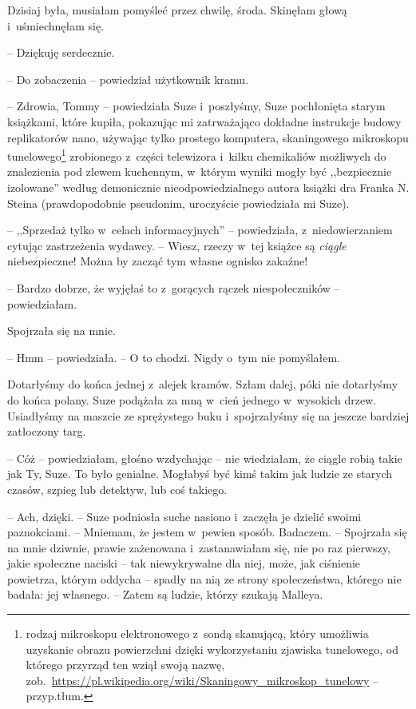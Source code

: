 \documentclass[oneside,polish,11pt,sfheadings]{mwbk}
\begin{document}
Dzisiaj była, musiałam pomyśleć przez chwilę, środa. Skinęłam głową i~uśmiechnęłam się. 

-- Dziękuję serdecznie.

-- Do zobaczenia -- powiedział użytkownik kramu.

-- Zdrowia, Tommy -- powiedziała Suze i~poszłyśmy, Suze pochłonięta starym
książkami, które kupiła, pokazując mi zatrważająco dokładne instrukcje
budowy replikatorów nano, używając tylko prostego komputera,
skaningowego mikroskopu tunelowego\footnote{ rodzaj mikroskopu elektronowego z~sondą skanującą, który umożliwia uzyskanie obrazu powierzchni dzięki
wykorzystaniu zjawiska tunelowego, od którego przyrząd ten wziął swoją
nazwę,
zob.~\url{https://pl.wikipedia.org/wiki/Skaningowy\_mikroskop\_tunelowy}
-- przyp.tłum.} zrobionego z~części telewizora i~kilku chemikaliów
możliwych do znalezienia pod zlewem kuchennym, w~którym wyniki mogły być
,,bezpiecznie izolowane'' według demonicznie nieodpowiedzialnego autora
książki dra Franka N. Steina (prawdopodobnie pseudonim, uroczyście
powiedziała mi Suze).

-- ,,Sprzedaż tylko w~celach informacyjnych'' -- powiedziała, z~niedowierzaniem cytując zastrzeżenia wydawcy. -- Wiesz, rzeczy w~tej
książce są \textit{ciągle} niebezpieczne! Można by zacząć tym własne
ognisko zakaźne!

-- Bardzo dobrze, że wyjęłaś to z~gorących rączek niespołeczników -- powiedziałam.

Spojrzała się na mnie. 

-- Hmm -- powiedziała. -- O to chodzi. Nigdy o~tym
nie pomyślałem.

Dotarłyśmy do końca jednej z~alejek kramów. Szłam dalej, póki nie
dotarłyśmy do końca polany. Suze podążała za mną w~cień jednego w~wysokich drzew. Usiadłyśmy na maszcie ze sprężystego buku i~spojrzałyśmy
się na jeszcze bardziej zatłoczony targ.

-- Cóż -- powiedziałam, głośno wzdychając -- nie wiedziałam, że ciągle
robią takie jak Ty, Suze. To było genialne. Mogłabyś być kimś takim jak
ludzie ze starych czasów, szpieg lub detektyw, lub coś takiego.

-- Ach, dzięki. -- Suze podniosła suche nasiono i~zaczęła je dzielić
swoimi paznokciami. -- Mniemam, że jestem w~pewien sposób. Badaczem. -- Spojrzała się na mnie dziwnie, prawie zażenowana i~zastanawiałam się,
nie po raz pierwszy, jakie społeczne naciski -- tak niewykrywalne dla
niej, może, jak ciśnienie powietrza, którym oddycha -- spadły na nią ze
strony społeczeństwa, którego nie badała: jej własnego. -- Zatem są
ludzie, którzy szukają Malleya.
\end{document}
